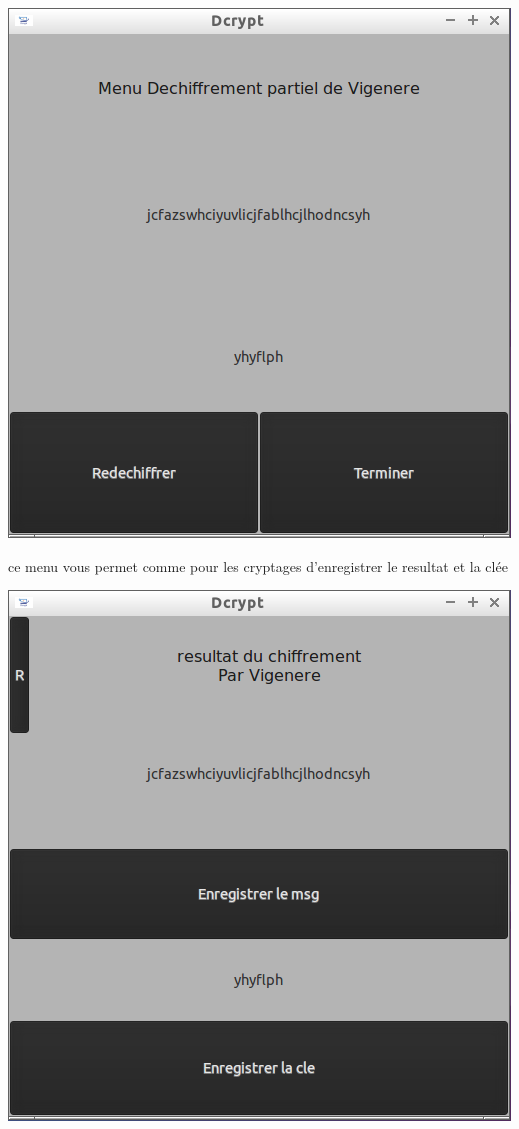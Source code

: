 \documentclass[a4]{article}
\begin{document}
			\begin{center}\includegraphics[scale=0.4]{15.png}\end{center}
			ce menu vous permet comme pour 
			les cryptages d'enregistrer le resultat et la clée
			\begin{center}\includegraphics[scale=0.4]{16.png}\end{center}
		
\end{document}

